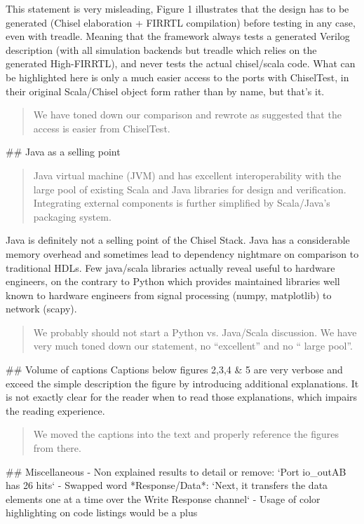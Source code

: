 \documentclass{article}
\newcommand{\reply}[1]{{\color{blue} #1}}
\begin{document}
This statement is very misleading, Figure 1 illustrates that the design has to be generated (Chisel elaboration + FIRRTL compilation) before testing in any case, even with treadle.
Meaning that the framework always tests a generated Verilog description (with all simulation backends but treadle which relies on the generated High-FIRRTL), and never tests the actual chisel/scala code.
What can be highlighted here is only a much easier access to the ports with ChiselTest, in their original Scala/Chisel object form rather than by name, but that's it.

\begin{quote}
\reply{We have toned down our comparison and rewrote as suggested that the access is easier from ChiselTest.}
\end{quote}


\#\# Java as a selling point
\begin{quote}
Java virtual machine (JVM) and has excellent interoperability with
the large pool of existing Scala and Java libraries for design
and verification. Integrating external components is further
simplified by Scala/Java's packaging system.
\end{quote}

Java is definitely not a selling point of the Chisel Stack.
Java has a considerable memory overhead and sometimes lead to dependency nightmare on comparison to traditional HDLs.
Few java/scala libraries actually reveal useful to hardware engineers, on the contrary to Python which provides maintained libraries well known to hardware engineers from signal processing (numpy, matplotlib) to network (scapy).

\begin{quote}
\reply{We probably should not start a Python vs. Java/Scala discussion. We have very much toned down our statement, no ``excellent''
and no `` large pool''.}
\end{quote}

\#\# Volume of captions
Captions below figures 2,3,4 \& 5 are very verbose and exceed the simple description the figure by introducing additional explanations.
It is not exactly clear for the reader when to read those explanations, which impairs the reading experience.  

\begin{quote}
\reply{
We moved the captions into the text and properly reference the figures from there.
}
\end{quote}

\#\# Miscellaneous
- Non explained results to detail or remove: `Port io\_outAB has 26 hits`
- Swapped word *Response/Data*: `Next, it transfers the data elements one at a time over the Write Response channel`
- Usage of color highlighting on code listings would be a plus
\end{document}
